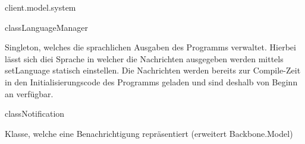 \begin{texdocpackage}{client.model.system}
\begin{texdocclass}{class}{LanguageManager}
\label{texdoclet:edu.kit.informatik.studyplan.client.model.system.LanguageManager}
\begin{texdocclassintro}
Singleton, welches die sprachlichen Ausgaben des Programms verwaltet. Hierbei
 lässt sich diei Sprache in welcher die Nachrichten ausgegeben werden mittels
 setLanguage statisch einstellen. Die Nachrichten werden bereits zur
 Compile-Zeit in den Initialisierungscode des Programms geladen und sind
 deshalb von Beginn an verfügbar.\end{texdocclassintro}
\begin{texdocclassconstructors}
\end{texdocclassconstructors}
\begin{texdocclassmethods}
\end{texdocclassmethods}
\end{texdocclass}


\begin{texdocclass}{class}{Notification}
\label{texdoclet:edu.kit.informatik.studyplan.client.model.system.Notification}
\begin{texdocclassintro}
Klasse, welche eine Benachrichtigung repräsentiert (erweitert Backbone.Model)\end{texdocclassintro}
\begin{texdocclassconstructors}
\end{texdocclassconstructors}
\end{texdocclass}



\end{texdocpackage}
